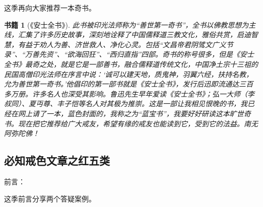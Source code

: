 \documentclass{ctexart}
\newtheorem{book}{书籍}
\begin{document}
这季再向大家推荐一本奇书。

\begin{book}[《安士全书》]
    此书被印光法师称为“善世第一奇书”，全书以佛教思想为主线，汇集了许多历史故事，深刻地诠释了中国儒释道三教文化，雅俗共赏，启迪智慧，有益于劝人为善、济世救人、净化心灵。包括“文昌帝君阴骘文广义节录”、“万善先资”、“欲海回狂”、“西归直指”四部。奇书的称号很多，但是《安士全书》最奇之处，就是它是一部善书，融合儒释道传统文化，中国净土宗十三祖的民国高僧印光法师在序言中说：‘诚可以建天地，质鬼神，羽翼六经，扶持名教，允为善世第一奇书。’他倡印的第一部书就是《安士全书》，发行后迅即流通达三百多万册。许多名人也深受其影响。鲁迅先生早年爱读《安士全书》；弘一大师（李叔同）、夏丏尊、丰子恺等名人对其极为推崇。这是一部让我相见恨晚的书，我已经在网上请了一本，蓝色封面的，我称之为“蓝宝书”，我要好好研读这本旷世奇书。现在把它推荐给广大戒友，希望有缘的戒友也能读到它，受到它的法益。南无阿弥陀佛！
\end{book}

\subsection{必知戒色文章之红五类}

前言：

这季前言分享两个答疑案例。
\end{document}
